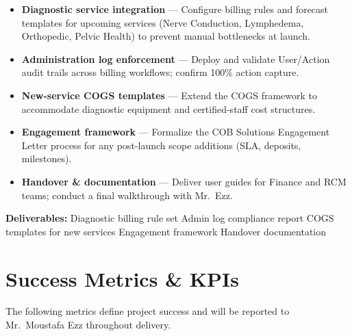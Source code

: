 \documentclass[11pt,a4paper]{article}
\begin{document}
\begin{tcolorbox}[infobox,title={Activities}]
\begin{itemize}
  \item \textbf{Diagnostic service integration} --- Configure billing rules and forecast
        templates for upcoming services (Nerve Conduction, Lymphedema, Orthopedic,
        Pelvic Health) to prevent manual bottlenecks at launch.
  \item \textbf{Administration log enforcement} --- Deploy and validate User/Action
        audit trails across billing workflows; confirm 100\% action capture.
  \item \textbf{New-service COGS templates} --- Extend the COGS framework to accommodate
        diagnostic equipment and certified-staff cost structures.
  \item \textbf{Engagement framework} --- Formalize the COB Solutions Engagement Letter process
        for any post-launch scope additions (SLA, deposits, milestones).
  \item \textbf{Handover \& documentation} --- Deliver user guides for Finance and RCM teams;
        conduct a final walkthrough with Mr.\ Ezz.
\end{itemize}
\end{tcolorbox}

\textbf{Deliverables:} Diagnostic billing rule set \textbullet{} Admin log compliance report
\textbullet{} COGS templates for new services \textbullet{} Engagement framework
\textbullet{} Handover documentation



\section{Success Metrics \& KPIs}

The following metrics define project success and will be reported to Mr.\ Moustafa Ezz
throughout delivery.
\end{document}
